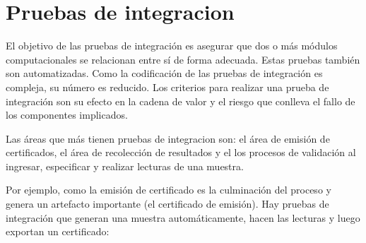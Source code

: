 \documentclass[letterpaper,10pt,spanish]{sphinxmanual}
\begin{document}
\begin{sphinxVerbatim}[commandchars=\\\{\}]
   
\end{sphinxVerbatim}


\section{Pruebas de integracion}
\label{\detokenize{requerimientos/STPD:pruebas-de-integracion}}
El objetivo de las pruebas de integración es asegurar que dos o más módulos
computacionales se relacionan entre sí de forma adecuada. Estas pruebas también
son automatizadas. Como la codificación de las pruebas de integración es compleja,
su número es reducido. Los criterios  para realizar una prueba de integración
son su efecto en la cadena de valor y el riesgo que conlleva el fallo de los
componentes implicados.

Las áreas que más tienen pruebas de integracion son: el área de emisión de
certificados, el área de recolección de resultados y el los procesos de
validación al ingresar, especificar y realizar lecturas de una muestra.

Por ejemplo, como la emisión de certificado es la culminación del proceso
y genera un artefacto importante (el certificado de emisión).
Hay pruebas de integración que generan una muestra automáticamente, hacen las
lecturas y luego exportan un certificado:

\begin{sphinxVerbatim}[commandchars=\\\{\}]
    
   
\end{sphinxVerbatim}
\end{document}
